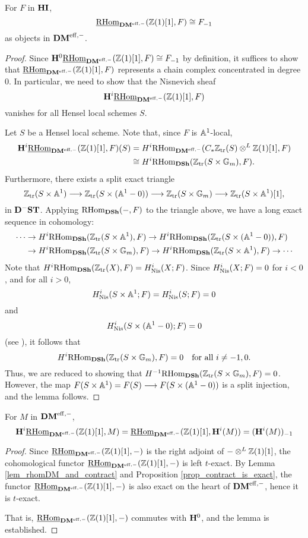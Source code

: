 \begin{lem}\label{lem_rhomDM_and_contract}
For $F$ in $\HI$,
\[
\ihomDMf(\Z(1)[1], F) \cong \RHI{F}
\]
as objects in $\DMeff$.
\end{lem}
\begin{proof}
Since $\HH^0 \ihomDMf(\Z(1)[1], F) \cong \RHI{F}$ by definition, 
it suffices to show that $\ihomDMf(\Z(1)[1], F)$ represents a 
chain complex concentrated in degree 0. In particular, we need
to show that the Nisnevich sheaf
\[
\HH^i\ihomDMf(\Z(1)[1], F)
\]
vanishes for all Hensel local schemes $S$.

Let $S$ be a Hensel local scheme. Note that, since $F$ is 
$\A^1$-local,
\begin{align*}
\HH^i\ihomDMf(\Z(1)[1], F)(S) &= H^i\rhomDMf(\CZtr(S) 
   \tDM \Z(1)[1], F) \\
   &\cong H^i\homDSh(\Ztr(S \times 
   \Gm), F).
\end{align*}
Furthermore, there exists a split exact triangle
\[
\Ztr(S \times \A^1) \to \Ztr(S \times (\A^1 - 0)) \to 
   \Ztr(S \times \Gm) \to \Ztr(S \times \A^1)[1],
\]
in $\DShCor$. Applying $\homDSh(-, F)$ to the triangle above, we 
have a long exact sequence in cohomology:
\begin{align*}
\cdots & \rightarrow H^i\homDSh(\Ztr(S \times \A^1), F) 
   \rightarrow H^i\homDSh(\Ztr(S \times (\A^1 - 0)), F) \\
 & \rightarrow H^i\homDSh(\Ztr(S \times \Gm), F) \rightarrow 
   H^i\homDSh(\Ztr(S \times \A^1), F) \rightarrow \cdots
\end{align*}
Note that $H^i\homDSh(\Ztr(X), F) = H_{\Nis}^i(X; F)$. Since
$H^i_{\Nis}(X; F) = 0$ for $i < 0$, and for all $i > 0$, 
\[
H_{\Nis}^i(S \times \A^1; F) = H_{\Nis}^i(S; F) = 0
\] 
and 
\[
H_{\Nis}^i(S \times (\A^1 - 0); F) = 0
\] 
(see \cite[24.5]{MVW}), it follows that 
\[
H^i\homDSh(\Ztr(S \times \Gm), F) = 0 \quad\textrm{for all $i \neq -1, 0$.}
\] 
Thus, we are reduced to showing that $H^{-1}\homDSh(\Ztr(S \times 
\Gm), F) = 0$. However, the map $F(S \times \A^1) = F(S) \to F(S 
\times (\A^1 - 0))$ is a split injection, and the lemma follows.
\end{proof}

\begin{lem}\label{lem_H_com_ihom_DM}
For $M$ in $\DMeff$, 
\[
\HH^i\ihomDMf(\Z(1)[1], M) = \ihomDMf(\Z(1)[1], \HH^i(M)) = 
   \RHI{(\HH^i(M))}
\]
\end{lem}
\begin{proof}
Since $\ihomDMf(\Z(1)[1], -)$ is the right adjoint of $-\tDM 
\Z(1)[1]$, the cohomological functor $\ihomDMf(\Z(1)[1], -)$ is 
left $t$-exact. By Lemma \ref{lem_rhomDM_and_contract} and 
Proposition \ref{prop_contract_is_exact}, the functor 
$\ihomDMf(\Z(1)[1], -)$ is also exact on the heart of $\DMeff$, 
hence it is $t$-exact.

That is, $\ihomDMf(\Z(1)[1], -)$ commutes with $\HH^0$,
and the lemma is established.
\end{proof}


